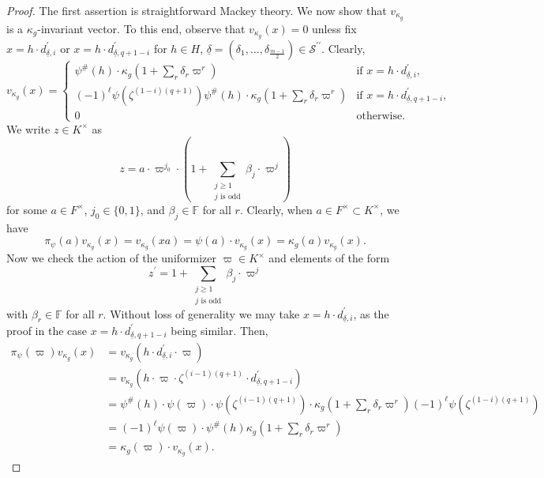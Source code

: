 \documentclass[12pt]{amsart}
\theoremstyle{definition}
\theoremstyle{remark}
\begin{document}
\begin{proof}
The first assertion is straightforward Mackey theory. We now show that $v_{\kappa_g}$ is a $\kappa_g$-invariant vector. To this end, observe that $v_{\kappa_g}(x) = 0$ unless fix $x = h \cdot d_{\underline{\delta}, i}^\prime$ or 
$x = h \cdot d_{\underline{\delta}, {q+1-i}}^\prime$ for $h \in H$, $\underline{\delta}=(\delta_1,\dots,\delta_{\frac{m-1}{2}}) \in \mathcal S^{\prime\prime}$. Clearly,
\[
v_{\kappa_g}(x) = 
\begin{cases}
\psi^\#(h) \cdot \kappa_g(1 + \sum\limits_{r} \delta_r \varpi^r)  &\text{if $x = h \cdot d_{\underline{\delta}, i}^\prime $,} \\
(-1)^\ell \psi(\zeta^{(1-i)(q+1)}) \psi^\#(h) \cdot \kappa_g(1 + \sum\limits_{r} \delta_r \varpi^r)  &\text{if $x = h \cdot d_{\underline{\delta}, q+1-i}^\prime $,} \\
0 &\text{otherwise.}
\end{cases}
\]
We write $z \in K^\times$ as 
\[z= a \cdot \varpi^{j_0} \cdot (1 + \sum\limits_{\substack{j \geq 1  \\    j \text{ is odd} }}\beta_j \cdot  \varpi^j )\]
for some $a \in F^\times$, $j_0 \in \{0,1\}$, and $\beta_j \in \mathbb F$ for all $r$. Clearly, when $a \in F^\times \subset K^\times $, we have 
\[\pi_\psi(a) v_{\kappa_g}(x)=v_{\kappa_g}(xa)=\psi(a) \cdot v_{\kappa_g}(x) = \kappa_g(a) v_{\kappa_g}(x).\]
Now we check the action of the uniformizer $\varpi \in K^\times$ and elements of the form 
\[z^\prime = 1 + \sum\limits_{\substack{j \geq 1  \\    j \text{ is odd} }}\beta_j \cdot  \varpi^j \]
with $\beta_r \in \mathbb F$ for all $r$. Without loss of generality we may take $x =  h \cdot d_{\underline{\delta}, i}^\prime$, as the proof in the case $x =  h \cdot d_{\underline{\delta}, q+1-i}^\prime$ being similar. Then, 
\begin{align*}
\pi_\psi(\varpi) v_{\kappa_g}(x) &= v_{\kappa_g}(h \cdot d_{\underline{\delta}, i}^\prime  \cdot \varpi) \\
&= v_{\kappa_g}(h \cdot \varpi \cdot \zeta^{(i-1)(q+1)} \cdot d_{\underline{\delta}, q+1-i}^\prime) \\
&= \psi^\#(h) \cdot \psi(\varpi) \cdot \psi(\zeta^{(i-1)(q+1)}) \cdot \kappa_g(1 + \sum\limits_{r} \delta_r \varpi^r)  (-1)^\ell \psi(\zeta^{(1-i)(q+1)}) \\
&= (-1)^\ell\psi(\varpi)  \cdot  \psi^\#(h) \kappa_g(1 + \sum\limits_{r} \delta_r \varpi^r)  \\
&= \kappa_g(\varpi) \cdot v_{\kappa_g}(x).

\end{align*}
\end{proof}
\end{document}

